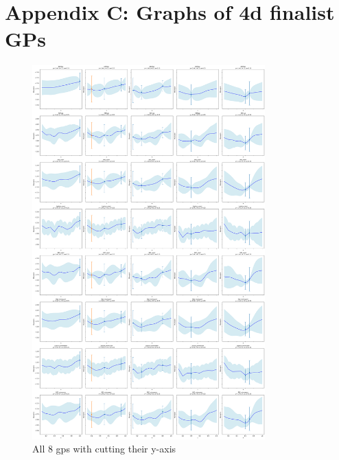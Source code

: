 \documentclass[12pt]{article}
\begin{document}
\section{Appendix C: Graphs of 4d finalist GPs}
\label{appendix:C}


\begin{figure}[H]
    \centering
    \includegraphics[width=0.8\textwidth]{LatexPlots/final_gps_plots/final_gps_ycuts.png}
    \caption{All 8 gps with cutting their y-axis}
    \label{fig:best8_ycuts}
\end{figure}
\end{document}
